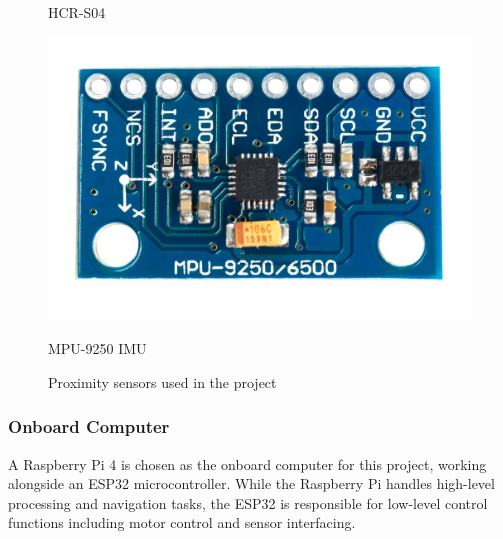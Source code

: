 \begin{figure}[H]
\begin{minipage}{0.3\textwidth}
        \caption{HCR-S04}\label{ultra}
    \end{minipage}\hfill
    \begin{minipage}{0.3\textwidth}
        \centering
        \includegraphics[width=\linewidth]{pics/mpu.png}
        \caption{MPU-9250 IMU}\label{mpu}
    \end{minipage}
    \caption{Proximity sensors used in the project}\label{prox}
    \label{fig:lidar_side_by_side}
\end{figure}

\newpage


\subsubsection{Onboard Computer}

\vspace{-0.8em}

A Raspberry Pi 4 is chosen as the onboard computer for this project, working alongside an ESP32 microcontroller. While the Raspberry Pi handles high-level processing and navigation tasks, the ESP32 is responsible for low-level control functions including motor control and sensor interfacing.

